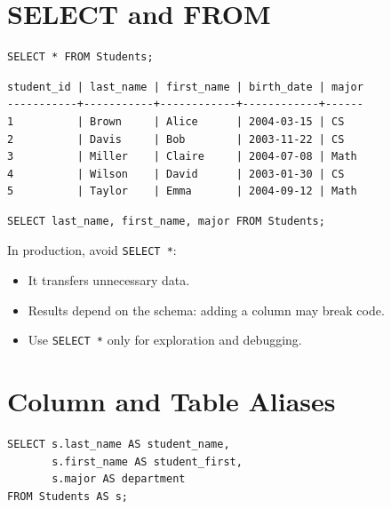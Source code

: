 \section{SELECT and FROM}

\begin{codeblock}[title=\textbf{Selecting All Columns}]
\begin{verbatim}
SELECT * FROM Students;
\end{verbatim}
\end{codeblock}

\begin{codeoutput}
\begin{verbatim}
student_id | last_name | first_name | birth_date | major
-----------+-----------+------------+------------+------
1          | Brown     | Alice      | 2004-03-15 | CS
2          | Davis     | Bob        | 2003-11-22 | CS
3          | Miller    | Claire     | 2004-07-08 | Math
4          | Wilson    | David      | 2003-01-30 | CS
5          | Taylor    | Emma       | 2004-09-12 | Math
\end{verbatim}
\end{codeoutput}

\begin{codeblock}[title=\textbf{Selecting Specific Columns}]
\begin{verbatim}
SELECT last_name, first_name, major FROM Students;
\end{verbatim}
\end{codeblock}

\begin{bestpractice}[title=\textbf{Avoid SELECT *}]
In production, avoid \texttt{SELECT *}:
\begin{itemize}
    \item It transfers unnecessary data.
    \item Results depend on the schema: adding a column may break code.
    \item Use \texttt{SELECT *} only for exploration and debugging.
\end{itemize}
\end{bestpractice}

\section{Column and Table Aliases}

\begin{codeblock}[title=\textbf{Using Aliases}]
\begin{verbatim}
SELECT s.last_name AS student_name,
       s.first_name AS student_first,
       s.major AS department
FROM Students AS s;
\end{verbatim}
\end{codeblock}

